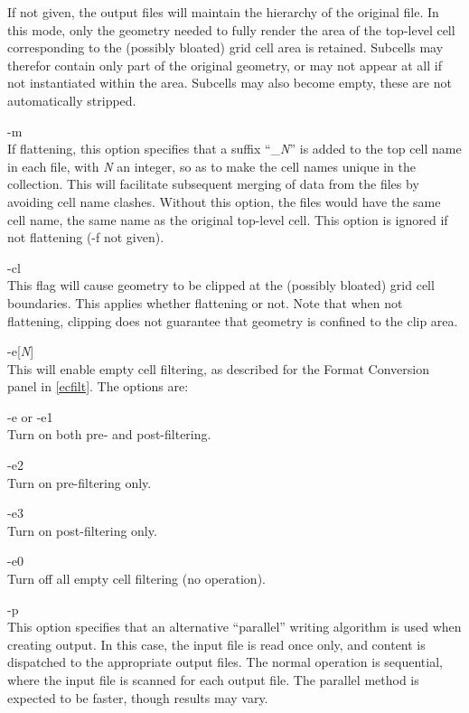 \begin{description}
If not given, the output files will maintain the hierarchy of the
original file.  In this mode, only the geometry needed to fully render
the area of the top-level cell corresponding to the (possibly bloated)
grid cell area is retained.  Subcells may therefor contain only part
of the original geometry, or may not appear at all if not instantiated
within the area.  Subcells may also become empty, these are not
automatically stripped.

\item{\vt -m}\\
If flattening, this option specifies that a suffix ``\_{\it N\/}'' is
added to the top cell name in each file, with {\it N} an integer, so
as to make the cell names unique in the collection.  This will
facilitate subsequent merging of data from the files by avoiding cell
name clashes.  Without this option, the files would have the same cell
name, the same name as the original top-level cell.  This option is
ignored if not flattening ({\vt -f} not given). 

\item{\vt -cl}\\
This flag will cause geometry to be clipped at the (possibly bloated)
grid cell boundaries.  This applies whether flattening or not.  Note
that when not flattening, clipping does not guarantee that geometry is
confined to the clip area.

\item{\vt -e}[{\it N\/}]\\
This will enable empty cell filtering, as described for the {\cb
Format Conversion} panel in \ref{ecfilt}.  The options are:
\begin{description}
\item{\vt -e} or {\vt -e1}\\
Turn on both pre- and post-filtering.
\item{\vt -e2}\\
Turn on pre-filtering only.
\item{\vt -e3}\\
Turn on post-filtering only.
\item{\vt -e0}\\
Turn off all empty cell filtering (no operation).
\end{description}

\item{\vt -p}\\
This option specifies that an alternative ``parallel'' writing
algorithm is used when creating output.  In this case, the input file
is read once only, and content is dispatched to the appropriate output
files.  The normal operation is sequential, where the input file is
scanned for each output file.  The parallel method is expected to be
faster, though results may vary. 
\end{description}

